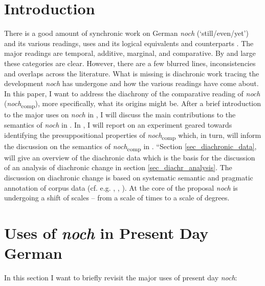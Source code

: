 \documentclass[output=paper
,modfonts
,nonflat]{langsci/langscibook}
\author{Martin Kopf-Giammanco\affiliation{Universität des Saarlandes}}
\begin{document}
\maketitle

\section{Introduction}\label{sec_intro}
There is a good amount of synchronic work on German \textit{noch} (`still/even/yet') and its various readings, uses and its logical equivalents and counterparts \citep[e.g.][]{koenig1977,loebner1989,Ippolito2007,umbach2009a_comp,umbach2009b_add,umbach2012,beck2016a_sub,beck2016b_disc}. The major readings are temporal, additive, marginal, and comparative. By and large these categories are clear. However, there are a few blurred lines, inconsistencies and overlaps across the literature. What is missing is diachronic work tracing the development \textit{noch} has undergone and how the various readings have come about. In this paper, I want to address the diachrony of the comparative reading of \textit{noch} (\textit{noch}\textsubscript{comp}), more specifically, what its origins might be. After a brief introduction to the major uses on \textit{noch} in , I will discuss the main contributions to the semantics of \textit{noch} in . In , I will report on an experiment geared towards identifying the presuppositional properties of \textit{noch}\textsubscript{comp} which, in turn, will inform the discussion on the semantics of \textit{noch}\textsubscript{comp} in . “Section \ref{sec_diachronic_data}, will give an overview of the diachronic data which is the basis for the discussion of an analysis of diachronic change in section \ref{sec_diachr_analysis}. The discussion on diachronic change is based on systematic semantic and pragmatic annotation of corpus data (cf. e.g. \citet{gergel_kopf-giammanco_watkins_2017}, \citet{gergel_bluemel_kopf_2016}, \citet{gergel_etal_2017}). At the core of the proposal \textit{noch} is undergoing a shift of scales -- from a scale of times to a scale of degrees.

\section{Uses of \textit{noch} in Present Day German} \label{sec_major_readings}

In this section I want to briefly revisit the major uses of present day \textit{noch}:
\end{document}
